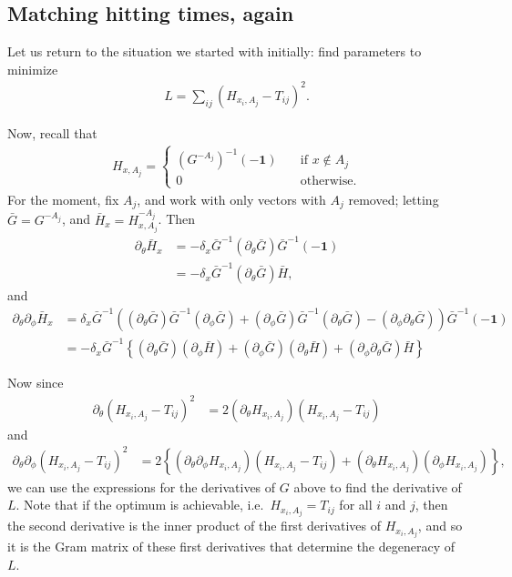 \documentclass{article}
\newcommand{\bone}{\mathbf{1}}
\begin{document}
\subsection{Matching hitting times, again}

Let us return to the situation we started with initially:
find parameters to minimize
\begin{align}
  L = \sum_{ij} \left( H_{x_i,A_j} - T_{ij} \right)^2 .
\end{align}

Now, recall that
\begin{align}
  H_{x,A_j} = \begin{cases}
    (G^{-A_j})^{-1} (-\bone) \quad & \text{if } x \notin A_j \\
    0 \quad & \text{otherwise.}
  \end{cases}
\end{align}
For the moment, fix $A_j$, and work with only vectors with $A_j$ removed;
letting $\bar G = G^{-A_j}$, and $\bar H_x = H_{x,A_j}^{-A_j}$.
Then
\begin{align}
  \partial_\theta \bar H_x 
  &= - \delta_x \bar G^{-1} (\partial_\theta \bar G) \bar G^{-1} (-\bone) \\
  &= - \delta_x \bar G^{-1} (\partial_\theta \bar G) \bar H ,
\end{align}
and
\begin{align}
  \partial_\theta \partial_\phi \bar H_x 
    &= \delta_x \bar G^{-1} \left( 
    (\partial_\theta \bar G) \bar G^{-1} (\partial_\phi \bar G)
    + (\partial_\phi \bar G) \bar G^{-1} (\partial_\theta \bar G)
    - (\partial_\phi \partial_\theta \bar G)
    \right) \bar G^{-1} (-\bone) \\
    &= - \delta_x \bar G^{-1} \left\{
    (\partial_\theta \bar G) ( \partial_\phi \bar H ) 
    + (\partial_\phi \bar G) ( \partial_\theta \bar H )
    + (\partial_\phi \partial_\theta \bar G) \bar H
    \right\}
\end{align}

Now since
\begin{align}
  \partial_\theta (H_{x_i,A_j} - T_{ij})^2 
    &= 2 ( \partial_\theta H_{x_i,A_j} )(H_{x_i,A_j} - T_{ij})
\end{align}
and
\begin{align}
  \partial_\theta \partial_\phi (H_{x_i,A_j} - T_{ij})^2 
    &= 2 \left\{
    ( \partial_\theta \partial_\phi H_{x_i,A_j} )(H_{x_i,A_j} - T_{ij})
    + ( \partial_\theta H_{x_i,A_j} ) ( \partial_\phi H_{x_i,A_j} ) \right\} ,
\end{align}
we can use the expressions for the derivatives of $G$ above to find the derivative of $L$.
Note that if the optimum is achievable, i.e.\ $H_{x_i,A_j} = T_{ij}$ for all $i$ and $j$, 
then the second derivative is the inner product of the first derivatives of $H_{x_i,A_j}$,
and so it is the Gram matrix of these first derivatives that determine the degeneracy of $L$.
\end{document}
